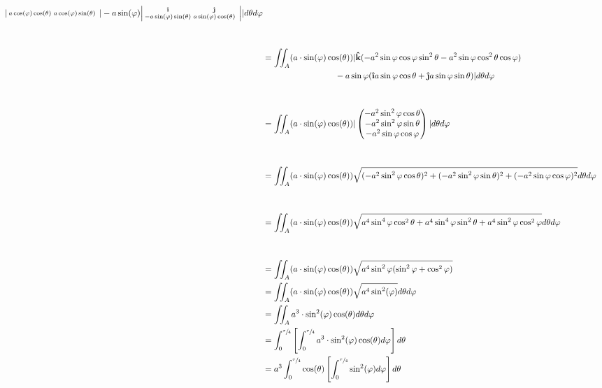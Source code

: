 \documentclass{../../myassignment}
\newcommand{\uvec}[1]{\boldsymbol{\hat{\textbf{#1}}}}
\begin{document}
\begin{answer}
\begin{align*}
\begin{vsmallmatrix}
					a\cos(\varphi)\cos(\theta) &
						a\cos(\varphi)\sin(\theta) &
				\end{vsmallmatrix}
				-a\sin(\varphi)
				\begin{vsmallmatrix}
					\uvec{\i} & \uvec{\j}\\
					-a\sin(\varphi)\sin(\theta) &
						a\sin(\varphi)\cos(\theta) &
				\end{vsmallmatrix}
				\vert  d \theta d \varphi \\[1cm]
				&= \iint_A (a \cdot \sin(\varphi)\cos(\theta)) \vert
				\uvec{k} (
					-a^2\sin\varphi\cos\varphi\sin^2\theta - 
					a^2\sin\varphi\cos^2\theta\cos\varphi
				) \\* &\hspace{3cm}
				-a\sin\varphi (
					\uvec{\i} a\sin\varphi\cos\theta + \uvec{\j}a\sin\varphi\sin\theta
				)
				\vert  d \theta d \varphi \\[1cm]
				&= \iint_A (a \cdot \sin(\varphi)\cos(\theta)) \vert
				\begin{pmatrix}
					-a^2\sin^2\varphi\cos\theta  \\
					-a^2\sin^2\varphi\sin\theta \\
					-a^2\sin\varphi\cos\varphi
				\end{pmatrix}
				\vert  d \theta d \varphi\\[1cm]
				&= \iint_A (a \cdot \sin(\varphi)\cos(\theta)) \sqrt{
					(-a^2\sin^2\varphi\cos\theta)^2 +
					(-a^2\sin^2\varphi\sin\theta)^2 +
					(-a^2\sin\varphi\cos\varphi)^2}
				 d \theta d \varphi\\[1cm]
				&= \iint_A (a \cdot \sin(\varphi)\cos(\theta)) \sqrt{
					a^4\sin^4\varphi\cos^2\theta +
					a^4\sin^4\varphi\sin^2\theta +
					a^4\sin^2\varphi\cos^2\varphi}
				 d \theta d \varphi\\[1cm]
				&= \iint_A (a \cdot \sin(\varphi)\cos(\theta)) \sqrt{a^4\sin^2\varphi (\sin^2\varphi + \cos^2\varphi)}\\
				&= \iint_A (a \cdot \sin(\varphi)\cos(\theta)) \sqrt{a^4\sin^2(\varphi)}  d\theta d\varphi \\
				&= \iint_A a^3 \cdot \sin^2(\varphi)\cos(\theta) d\theta d\varphi \\
				&= \int_0^{\sfrac{\tau}{4}} \left[\int_0^{\sfrac{\tau}{4}} a^3 \cdot \sin^2(\varphi)\cos(\theta)  d\varphi\right]  d\theta \\
				&= a^3 \int_0^{\sfrac{\tau}{4}} \cos(\theta) \left[\int_0^{\sfrac{\tau}{4}} \sin^2(\varphi)  d\varphi\right]  d\theta \\

\end{align*}
\end{answer}
\end{document}
